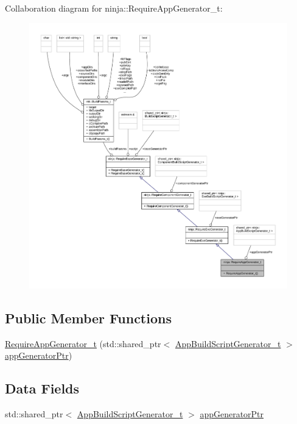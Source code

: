 Collaboration diagram for ninja\+:\+:Require\+App\+Generator\+\_\+t\+:
\nopagebreak
\begin{figure}[H]
\begin{center}
\leavevmode
\includegraphics[width=350pt]{structninja_1_1_require_app_generator__t__coll__graph}
\end{center}
\end{figure}
\subsection*{Public Member Functions}
\begin{DoxyCompactItemize}
\item 
\hyperlink{structninja_1_1_require_app_generator__t_a9fa5ca5cb8d5e22877255f88d08dbb94}{Require\+App\+Generator\+\_\+t} (std\+::shared\+\_\+ptr$<$ \hyperlink{classninja_1_1_app_build_script_generator__t}{App\+Build\+Script\+Generator\+\_\+t} $>$ \hyperlink{structninja_1_1_require_app_generator__t_ad4d8afe12062be89a150f6ef7098014b}{app\+Generator\+Ptr})
\end{DoxyCompactItemize}
\subsection*{Data Fields}
\begin{DoxyCompactItemize}
\item 
std\+::shared\+\_\+ptr$<$ \hyperlink{classninja_1_1_app_build_script_generator__t}{App\+Build\+Script\+Generator\+\_\+t} $>$ \hyperlink{structninja_1_1_require_app_generator__t_ad4d8afe12062be89a150f6ef7098014b}{app\+Generator\+Ptr}
\end{DoxyCompactItemize}


